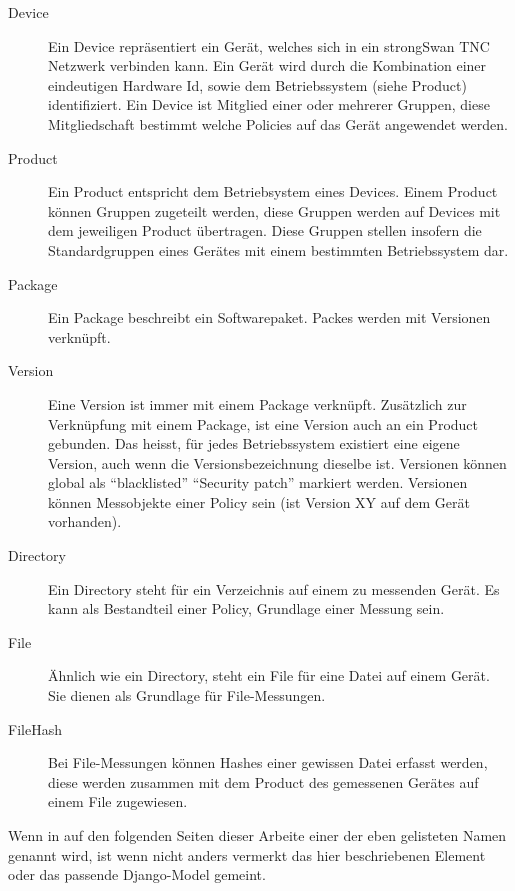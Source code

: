 \begin{description}
	\item[Device] Ein Device repräsentiert ein Gerät, welches sich in ein
	strongSwan TNC Netzwerk verbinden kann. Ein Gerät wird durch die Kombination
	einer eindeutigen Hardware Id, sowie dem Betriebssystem (siehe Product)
	identifiziert. Ein Device ist Mitglied einer oder mehrerer Gruppen, diese
	Mitgliedschaft bestimmt welche Policies auf das Gerät angewendet werden.
	
	\item[Product] Ein Product entspricht dem Betriebsystem eines Devices. Einem
	Product können Gruppen zugeteilt werden, diese Gruppen werden auf Devices mit
	dem jeweiligen Product übertragen. Diese Gruppen stellen insofern die
	Standardgruppen eines Gerätes mit einem bestimmten Betriebssystem dar.
	
	\item[Package] Ein Package beschreibt ein Softwarepaket. Packes werden mit Versionen verknüpft.
	
	\item[Version] Eine Version ist immer mit einem Package verknüpft. 
	Zusätzlich zur Verknüpfung mit einem Package, ist eine Version auch an ein Product gebunden.
	Das heisst, für jedes Betriebssystem existiert eine eigene Version, auch wenn die Versionsbezeichnung dieselbe ist.
	Versionen können global als \enquote{blacklisted} \enquote{Security patch} markiert werden.
	Versionen können Messobjekte einer Policy sein (ist Version XY auf dem Gerät vorhanden).
		
	\item[Directory] Ein Directory steht für ein Verzeichnis auf einem zu messenden
	Gerät. Es kann als Bestandteil einer Policy, Grundlage einer Messung sein.
	
	\item[File] Ähnlich wie ein Directory, steht ein File für eine Datei auf einem
	Gerät. Sie dienen als Grundlage für File-Messungen.
	
	\item[FileHash] Bei File-Messungen können Hashes einer gewissen Datei erfasst
	werden, diese werden zusammen mit dem Product des gemessenen Gerätes auf einem
	File zugewiesen.
	
\end{description}

Wenn in auf den folgenden Seiten dieser Arbeite einer der eben gelisteten Namen
genannt wird, ist wenn nicht anders vermerkt das hier beschriebenen Element oder
das passende Django-Model gemeint.

